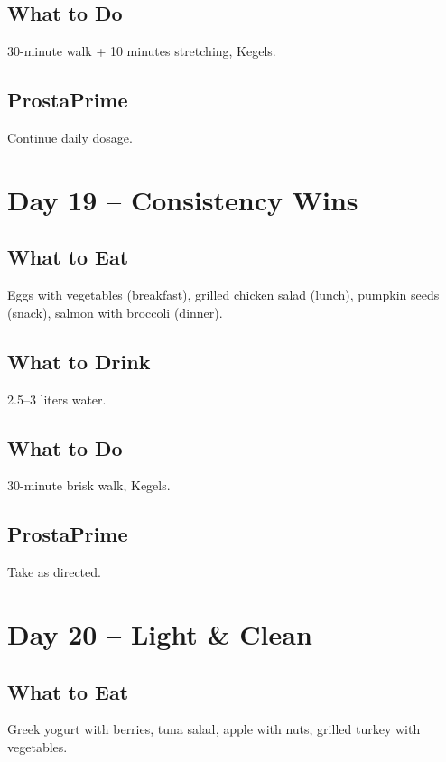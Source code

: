 \documentclass[11pt,oneside]{book}
\begin{document}
\section*{What to Do}
30-minute walk + 10 minutes stretching, Kegels.

\section*{ProstaPrime}
Continue daily dosage.

\clearpage

\chapter*{Day 19 – Consistency Wins}

\section*{What to Eat}
Eggs with vegetables (breakfast), grilled chicken salad (lunch), pumpkin seeds (snack), salmon with broccoli (dinner).

\section*{What to Drink}
2.5--3 liters water.

\section*{What to Do}
30-minute brisk walk, Kegels.

\section*{ProstaPrime}
Take as directed.

\clearpage


\chapter*{Day 20 – Light & Clean}

\section*{What to Eat}
Greek yogurt with berries, tuna salad, apple with nuts, grilled turkey with vegetables.
\end{document}
